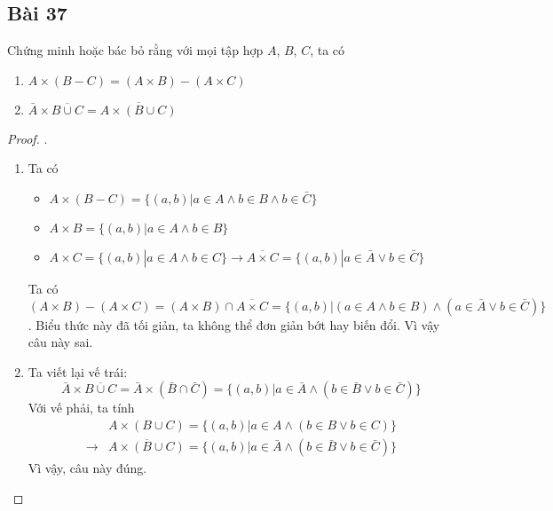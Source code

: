 \subsection*{Bài 37}
Chứng minh hoặc bác bỏ rằng với mọi tập hợp $A$, $B$, $C$, ta có
\begin{enumerate}[label=\alph*)]
    \item $A\times(B-C)=(A\times B)-(A\times C)$
    \item $\bar A\times\overline{B\cup C}=\overline{A\times(B\cup C)}$
\end{enumerate}
\begin{proof}.
    \begin{enumerate}[label=\alph*)]
        \item Ta có \begin{itemize}
            \item $A\times(B-C)=\{(a,b)|a\in A\land b\in B\land b \in\bar C\}$
            \item $A\times B=\{(a,b)|a\in A\land b\in B\}$
            \item $A\times C=\{(a,b)|a\in A\land b\in C\}\rightarrow \overline{A\times C}=\{(a,b)|a\in\bar A\lor b\in\bar C\}$
        \end{itemize}
        Ta có $(A\times B)-(A\times C)=(A\times B)\cap\overline{A\times C}=\{(a,b)|(a\in A\land b\in B)\land(a\in\bar A\lor b\in\bar C)\}$. Biểu thức này đã tối giản, ta không thể đơn giản bớt hay biến đổi. Vì vậy câu này sai.
        \item Ta viết lại vế trái:$$\bar A\times\overline{B\cup C}=\bar A\times(\bar B\cap \bar C)=\{(a,b)|a\in\bar A\land(b\in\bar B\lor b\in\bar C)\}$$
        Với vế phải, ta tính \begin{align*}
            &A\times(B\cup C)=\{(a,b)|a\in A\land(b\in B\lor b\in C)\}\\
            \rightarrow&\overline{A\times(B\cup C)}=\{(a,b)|a\in\bar A\land(b\in\bar B\lor b\in\bar C)\}
        \end{align*}
        Vì vậy, câu này đúng.
    \end{enumerate}
\end{proof}